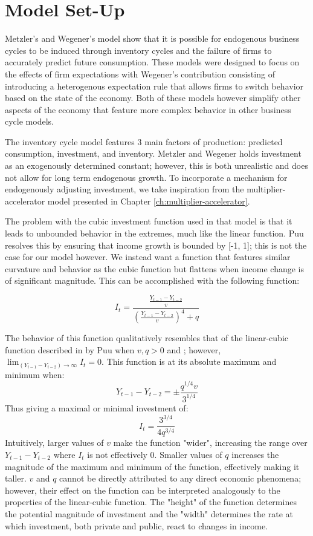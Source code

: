 \section{Model Set-Up}
Metzler's and Wegener's model show that it is possible for endogenous business cycles to be induced through inventory cycles and the failure of firms to accurately predict future consumption. These models were designed to focus on the effects of firm expectations with Wegener's contribution consisting of introducing a heterogenous expectation rule that allows firms to switch behavior based on the state of the economy. Both of these models however simplify other aspects of the economy that feature more complex behavior in other business cycle models.

The inventory cycle model features 3 main factors of production: predicted consumption, investment, and inventory. Metzler and Wegener holds investment as an exogenously determined constant; however, this is both unrealistic and does not allow for long term endogenous growth. To incorporate a mechanism for endogenously adjusting investment, we take inspiration from the multiplier-accelerator model presented in Chapter \ref{ch:multiplier-accelerator}. 

The problem with the cubic investment function used in that model is that it leads to unbounded behavior in the extremes, much like the linear function. Puu resolves this by ensuring that income growth is bounded by [-1, 1]; this is not the case for our model however. We instead want a function that features similar curvature and behavior as the cubic function but flattens when income change is of significant magnitude. This can be accomplished with the following function:

\begin{equation}
    I_t = \frac{\frac{Y_{t-1}-Y_{t-2}}{v}}{(\frac{Y_{t-1}-Y_{t-2}}{v})^4+q}	
\end{equation}

The behavior of this function qualitatively resembles that of the linear-cubic function described in by Puu when $v,q>0$ and ; however, $\lim_{(Y_{t-1}-Y_{t-2})\to\infty}I_t=0$. This function is at its absolute maximum and minimum when:
\begin{equation*}
    Y_{t-1}-Y_{t-2}=\pm\frac{q^{1/4}v}{3^{1/4}}
\end{equation*}
Thus giving a maximal or minimal investment of:
\begin{equation*}
    I_t=\frac{3^{3/4}}{4q^{3/4}}
\end{equation*}
Intuitively, larger values of $v$ make the function "wider", increasing the range over $Y_{t-1}-Y_{t-2}$ where $I_t$ is not effectively 0. Smaller values of $q$ increases the magnitude of the maximum and minimum of the function, effectively making it taller. $v$ and $q$ cannot be directly attributed to any direct economic phenomena; however, their effect on the function can be interpreted analogously to the properties of the linear-cubic function. The "height" of the function determines the potential magnitude of investment and the "width" determines the rate at which investment, both private and public, react to changes in income.


